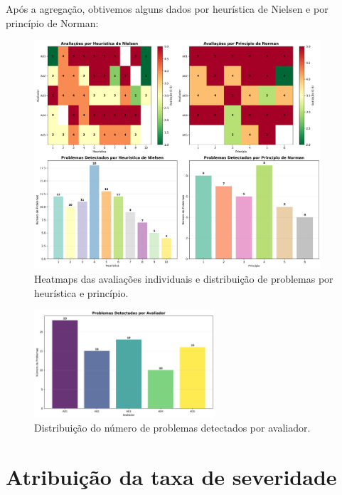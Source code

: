 Após a agregação, obtivemos alguns dados por heurística de Nielsen e por princípio de Norman:




\begin{figure}[H]
    \centering
    \includegraphics[width=0.95\textwidth]{../figures/hci/heatmaps_usabilidade.png}
    \caption{Heatmaps das avaliações individuais e distribuição de problemas por heurística e princípio.}
    \label{fig:heatmaps-usabilidade}
\end{figure}

\begin{figure}[H]
    \centering
    \includegraphics[width=0.6\textwidth]{../figures/hci/problemas_por_avaliador.png}
    \caption{Distribuição do número de problemas detectados por avaliador.}
    \label{fig:problemas-por-avaliador}
\end{figure}

\section{Atribuição da taxa de severidade}


